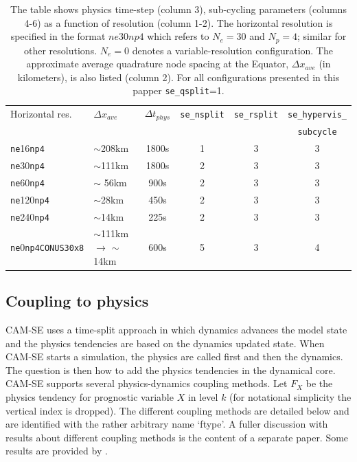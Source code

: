 \documentclass{agujournal}
\begin{document}
{ \begin{table}
 \caption{The table shows physics time-step (column 3), sub-cycling parameters (columns 4-6) as a function of resolution (column 1-2). The horizontal resolution is specified in the format $ne30np4$ which refers to $N_e=30$ and $N_p=4$; similar for other resolutions.  $N_e=0$ denotes a variable-resolution configuration. The approximate average quadrature node spacing at the Equator, $\Delta x_{ave}$ (in kilometers), is also listed (column 2). For all configurations presented in this papper {\tt{se\_qsplit}}=1.}
 \centering
 \begin{tabular}{llcccc}
 \hline
 Horizontal res. & $\Delta x_{ave}$  & $\Delta t_{phys}$ & {\tt{se\_nsplit}} & {\tt{se\_rsplit}} & {\tt{se\_hypervis\_}} \\
 &&&&&{\tt subcycle} \\
 \hline
   {\tt{ne}}16{\tt{np4}}  & $\sim$208km   & 1800s & 1 & 3 & 3  \\
   {\tt{ne}}30{\tt{np4}}  & $\sim$111km   & 1800s & 2 & 3 & 3  \\
   {\tt{ne}}60{\tt{np4}}  & $\sim$ 56km   & 900s  & 2 & 3 & 3  \\
   {\tt{ne}}120{\tt{np4}} & $\sim$28km    & 450s  & 2 & 3 & 3  \\
   {\tt{ne}}240{\tt{np4}} &  $\sim$14km   & 225s  & 2 & 3 & 3  \\
   {\tt{ne}}0{\tt{np4CONUS30x8}}  & $\sim$111km$\rightarrow$ $\sim$14km &  600s & 5 & 3 & 4  \\
 \hline
 \end{tabular}
 \label{table:subc}
 \end{table}

%
\subsection{Coupling to physics}
CAM-SE uses a time-split approach in which dynamics advances the model state and the physics tendencies are based on the dynamics updated state. When CAM-SE starts a simulation, the physics are called first and then the  dynamics. The question is then how to add the physics tendencies in the dynamical core. CAM-SE supports several physics-dynamics coupling methods. Let $F_X$ be the physics tendency for prognostic variable $X$ in level $k$ (for notational simplicity the vertical index is dropped). The different coupling methods are detailed below and are identified with the rather arbitrary name `ftype'. A fuller discussion with results about different coupling methods is the content of a separate paper. Some results are provided by \citet{TJ2016GMD}.
}
\end{document}
